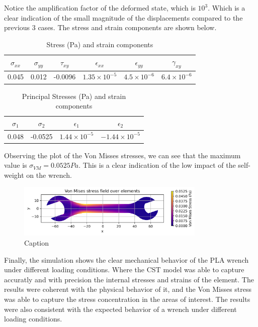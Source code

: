 Notice the amplification factor of the deformed state, which is $10^3$. Which is a clear indication of the small magnitude of the displacements compared to the previous 3 cases. The stress and strain components are shown below.

\begin{table}[H]
    \centering
    \caption{Stress (Pa) and strain components}
    \begin{tabular}{|c|c|c|c|c|c|}
    \hline
    $\sigma_{xx}$ & $\sigma_{yy}$ & $\tau_{xy}$ & $\epsilon_{xx}$ & $\epsilon_{yy}$ & $\gamma_{xy}$ \\
    \hline
    0.045 & 0.012 & -0.0096 & $1.35\times10^{-5}$ & $4.5\times10^{-6}$ & $6.4\times10^{-6}$ \\
    \hline
    \end{tabular}
    \label{tab:tabla1}
\end{table}
    
\begin{table}[H]
    \centering
    \caption{Principal Stresses (Pa) and strain components}
    \begin{tabular}{|c|c|c|c|}
    \hline
    $\sigma_{1}$ & $\sigma_{2}$ & $\epsilon_{1}$ & $\epsilon_{2}$ \\
    \hline
    0.048 & -0.0525 & $1.44\times10^{-5}$ & $-1.44\times10^{-5}$ \\
    \hline
    \end{tabular}
    \label{tab:tabla2}
\end{table}

Observing the plot of the Von Misses stresses, we can see that the maximum value is $\sigma_{VM} = 0.0525 Pa$. This is a clear indication of the low impact of the self-weight on the wrench.

\begin{figure}[H]
    \centering
    \includegraphics[width=0.8\textwidth]{GRAFICOS/Case d_von_mises.png}
    \caption{Caption}
    \label{fig:principal}
\end{figure}

Finally, the simulation shows the clear mechanical behavior of the PLA wrench under different loading conditions. Where the CST model was able to capture accuratly and with precision the internal stresses and strains of the element. The results were coherent with the physical behavior of it, and the Von Misses stress was able to capture the stress concentration in the areas of interest. The results were also consistent with the expected behavior of a wrench under different loading conditions.




